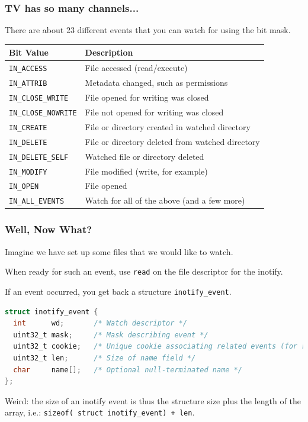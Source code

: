 \begin{frame}
\frametitle{TV has so many channels...}

There are about 23 different events that you can watch for using the bit mask.

\begin{center}
	\begin{tabular}{l|l}
		\textbf{Bit Value}          & \textbf{Description}                             \\ \hline
		\texttt{IN\_ACCESS}         & File accessed (read/execute)                     \\
		\texttt{IN\_ATTRIB}         & Metadata changed, such as permissions            \\
		\texttt{IN\_CLOSE\_WRITE}   & File opened for writing was closed               \\
		\texttt{IN\_CLOSE\_NOWRITE} & File not opened for writing was closed           \\
		\texttt{IN\_CREATE}         & File or directory created in watched directory   \\
		\texttt{IN\_DELETE}         & File or directory deleted from watched directory \\
		\texttt{IN\_DELETE\_SELF}   & Watched file or directory deleted                \\
		\texttt{IN\_MODIFY}         & File modified (write, for example)               \\
		\texttt{IN\_OPEN}           & File opened                                      \\
		\texttt{IN\_ALL\_EVENTS}    & Watch for all of the above (and a few more)
	\end{tabular}
\end{center}

\end{frame}


\begin{frame}[fragile]
\frametitle{Well, Now What?}

Imagine we have set up some files that we would like to watch. 

When ready for such an event, use \texttt{read} on the file descriptor for the inotify. 

If an event occurred, you get back a structure \texttt{inotify\_event}.

\begin{lstlisting}[language=C]
struct inotify_event {
  int      wd;       /* Watch descriptor */
  uint32_t mask;     /* Mask describing event */
  uint32_t cookie;   /* Unique cookie associating related events (for rename(2))*/  
  uint32_t len;      /* Size of name field */
  char     name[];   /* Optional null-terminated name */
};
\end{lstlisting}

Weird: the size of an inotify event is thus the structure size plus the length of the array, i.e.: \texttt{sizeof( struct inotify\_event) + len}.

\end{frame}


